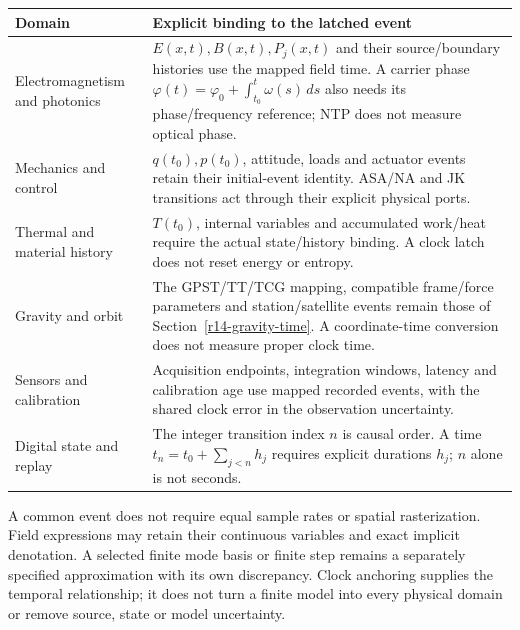 \begin{longtable}{P{.24\textwidth}P{.68\textwidth}}
\toprule
Domain & Explicit binding to the latched event\\\midrule
\endhead
Electromagnetism and photonics & $E(x,t),B(x,t),P_j(x,t)$ and their source/boundary histories use the mapped field time. A carrier phase $\varphi(t)=\varphi_0+\int_{t_0}^{t}\omega(s)\,ds$ also needs its phase/frequency reference; NTP does not measure optical phase.\\
Mechanics and control & $q(t_0),p(t_0)$, attitude, loads and actuator events retain their initial-event identity. ASA/NA and JK transitions act through their explicit physical ports.\\
Thermal and material history & $T(t_0)$, internal variables and accumulated work/heat require the actual state/history binding. A clock latch does not reset energy or entropy.\\
Gravity and orbit & The GPST/TT/TCG mapping, compatible frame/force parameters and station/satellite events remain those of Section~\ref{r14-gravity-time}. A coordinate-time conversion does not measure proper clock time.\\
Sensors and calibration & Acquisition endpoints, integration windows, latency and calibration age use mapped recorded events, with the shared clock error in the observation uncertainty.\\
Digital state and replay & The integer transition index $n$ is causal order. A time $t_n=t_0+\sum_{j<n}h_j$ requires explicit durations $h_j$; $n$ alone is not seconds.\\
\bottomrule
\end{longtable}

A common event does not require equal sample rates or spatial rasterization.
Field expressions may retain their continuous variables and exact implicit
denotation. A selected finite mode basis or finite step remains a separately
specified approximation with its own discrepancy. Clock anchoring supplies
the temporal relationship; it does not turn a finite model into every
physical domain or remove source, state or model uncertainty.
